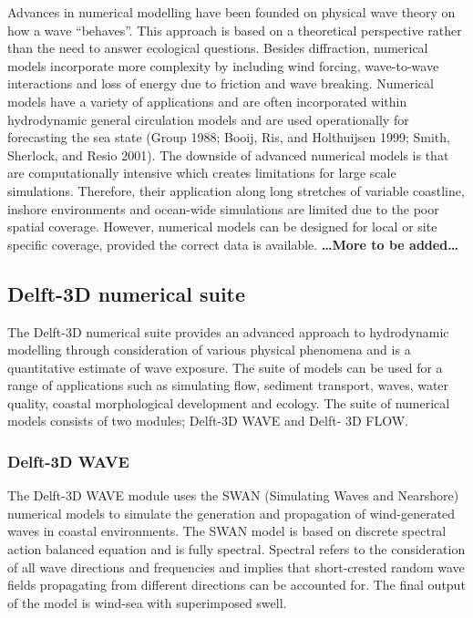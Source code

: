 \documentclass[]{article}
\begin{document}
Advances in numerical modelling have been founded on physical wave
theory on how a wave ``behaves''. This approach is based on a
theoretical perspective rather than the need to answer ecological
questions. Besides diffraction, numerical models incorporate more
complexity by including wind forcing, wave-to-wave interactions and loss
of energy due to friction and wave breaking. Numerical models have a
variety of applications and are often incorporated within hydrodynamic
general circulation models and are used operationally for forecasting
the sea state (Group 1988; Booij, Ris, and Holthuijsen 1999; Smith,
Sherlock, and Resio 2001). The downside of advanced numerical models is
that are computationally intensive which creates limitations for large
scale simulations. Therefore, their application along long stretches of
variable coastline, inshore environments and ocean-wide simulations are
limited due to the poor spatial coverage. However, numerical models can
be designed for local or site specific coverage, provided the correct
data is available. \textbf{\ldots{}More to be added\ldots{}}

\hypertarget{delft-3d-numerical-suite}{%
\subsection{Delft-3D numerical suite}\label{delft-3d-numerical-suite}}

The Delft-3D numerical suite provides an advanced approach to
hydrodynamic modelling through consideration of various physical
phenomena and is a quantitative estimate of wave exposure. The suite of
models can be used for a range of applications such as simulating flow,
sediment transport, waves, water quality, coastal morphological
development and ecology. The suite of numerical models consists of two
modules; Delft-3D WAVE and Delft- 3D FLOW.

\hypertarget{delft-3d-wave}{%
\subsubsection{Delft-3D WAVE}\label{delft-3d-wave}}

The Delft-3D WAVE module uses the SWAN (Simulating Waves and Nearshore)
numerical models to simulate the generation and propagation of
wind-generated waves in coastal environments. The SWAN model is based on
discrete spectral action balanced equation and is fully spectral.
Spectral refers to the consideration of all wave directions and
frequencies and implies that short-crested random wave fields
propagating from different directions can be accounted for. The final
output of the model is wind-sea with superimposed swell.
\end{document}
